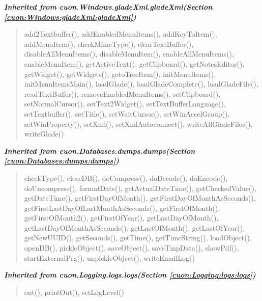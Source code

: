 \large{\textbf{\textit{Inherited from cuon.Windows.gladeXml.gladeXml\textit{(Section \ref{cuon:Windows:gladeXml:gladeXml})}}}}

\begin{quote}
add2Textbuffer(), addEnabledMenuItems(), addKeyToItem(), addMenuItem(), checkMimeType(), clearTextBuffer(), disableAllMenuItems(), disableMenuItem(), enableAllMenuItems(), enableMenuItem(), getActiveText(), getClipboard(), getNotesEditor(), getWidget(), getWidgets(), gotoTreeItem(), initMenuItems(), initMenuItemsMain(), loadGlade(), loadGladeComplete(), loadGladeFile(), readTextBuffer(), removeEnabledMenuItems(), setClipboard(), setNormalCursor(), setText2Widget(), setTextBufferLanguage(), setTextbuffer(), setTitle(), setWaitCursor(), setWinAccelGroup(), setWinProperty(), setXml(), setXmlAutoconnect(), writeAllGladeFiles(), writeGlade()
\end{quote}

\large{\textbf{\textit{Inherited from cuon.Databases.dumps.dumps\textit{(Section \ref{cuon:Databases:dumps:dumps})}}}}

\begin{quote}
checkType(), closeDB(), doCompress(), doDecode(), doEncode(), doUncompress(), formatDate(), getActualDateTime(), getCheckedValue(), getDateTime(), getFirstDayOfMonth(), getFirstDayOfMonthAsSeconds(), getFirstLastDayOfLastMonthAsSeconds(), getFirstOfMonth(), getFirstOfMonth2(), getFirstOfYear(), getLastDayOfMonth(), getLastDayOfMonthAsSeconds(), getLastOfMonth(), getLastOfYear(), getNewUUID(), getSeconds(), getTime(), getTimeString(), loadObject(), openDB(), pickleObject(), saveObject(), saveTmpData(), showPdf(), startExternalPrg(), unpickleObject(), writeEmailLog()
\end{quote}

\large{\textbf{\textit{Inherited from cuon.Logging.logs.logs\textit{(Section \ref{cuon:Logging:logs:logs})}}}}

\begin{quote}
out(), printOut(), setLogLevel()
\end{quote}
